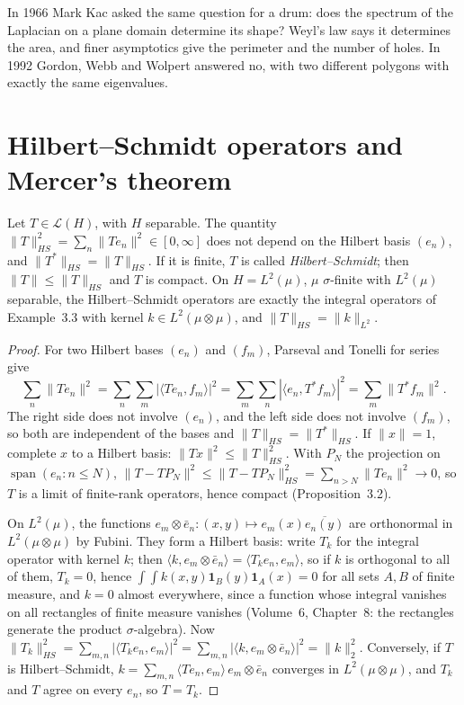 \begin{remark}
In 1966 Mark Kac asked the same question for a drum: does the spectrum of the Laplacian on a plane domain determine its shape? Weyl's law says it determines the area, and finer asymptotics give the perimeter and the
number of holes. In 1992 Gordon, Webb and Wolpert answered no, with two different polygons with exactly the same eigenvalues.
\end{remark}

\section{Hilbert--Schmidt operators and Mercer's theorem}

\begin{proposition}\label{prop:hs}
Let $T\in\mathcal L(H)$, with $H$ separable. The quantity $\|T\|_{HS}^2=\sum_n\|Te_n\|^2\in[0,\infty]$ does not depend on the Hilbert basis $(e_n)$, and $\|T^*\|_{HS}=\|T\|_{HS}$. If it is finite, $T$ is called
\emph{Hilbert--Schmidt}; then $\|T\|\le\|T\|_{HS}$ and $T$ is compact. On $H=L^2(\mu)$, $\mu$ $\sigma$-finite with $L^2(\mu)$ separable, the Hilbert--Schmidt operators are exactly the integral operators of
Example~3.3 with kernel $k\in L^2(\mu\otimes\mu)$, and $\|T\|_{HS}=\|k\|_{L^2}$.
\end{proposition}
\begin{proof}
For two Hilbert bases $(e_n)$ and $(f_m)$, Parseval and Tonelli for series give
\[\sum_n\|Te_n\|^2=\sum_n\sum_m|\langle Te_n,f_m\rangle|^2=\sum_m\sum_n|\langle e_n,T^*f_m\rangle|^2=\sum_m\|T^*f_m\|^2.\]
The right side does not involve $(e_n)$, and the left side does not involve $(f_m)$, so both are independent of the bases and $\|T\|_{HS}=\|T^*\|_{HS}$. If $\|x\|=1$, complete $x$ to a Hilbert basis: $\|Tx\|^2\le\|T\|_{HS}^2$.
With $P_N$ the projection on $\operatorname{span}(e_n:n\le N)$, $\|T-TP_N\|^2\le\|T-TP_N\|_{HS}^2=\sum_{n>N}\|Te_n\|^2\to0$, so $T$ is a limit of finite-rank operators, hence compact (Proposition~3.2).

On $L^2(\mu)$, the functions $e_m\otimes\bar e_n:(x,y)\mapsto e_m(x)\overline{e_n(y)}$ are orthonormal in $L^2(\mu\otimes\mu)$ by Fubini. They form a Hilbert basis: write $T_k$ for the integral operator with kernel $k$; then
$\langle k,e_m\otimes\bar e_n\rangle=\langle T_ke_n,e_m\rangle$, so if $k$ is orthogonal to all of them, $T_k=0$, hence $\int\!\!\int k(x,y)\mathbf 1_B(y)\mathbf 1_A(x)=0$ for all sets $A,B$ of finite measure, and $k=0$ almost
everywhere, since a function whose integral vanishes on all rectangles of finite measure vanishes (Volume~6, Chapter~8: the rectangles generate the product $\sigma$-algebra). Now $\|T_k\|_{HS}^2=\sum_{m,n}|\langle T_ke_n,e_m\rangle|^2=\sum_{m,n}|\langle k,e_m\otimes\bar e_n\rangle|^2=\|k\|_2^2$.
Conversely, if $T$ is Hilbert--Schmidt, $k=\sum_{m,n}\langle Te_n,e_m\rangle\,e_m\otimes\bar e_n$ converges in $L^2(\mu\otimes\mu)$, and $T_k$ and $T$ agree on every $e_n$, so $T=T_k$.
\end{proof}

